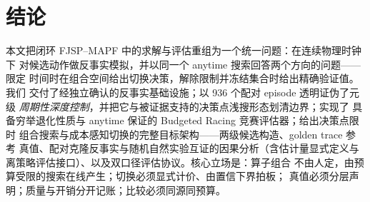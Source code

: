 \documentclass[11pt,a4paper]{article}
\newcommand{\racing}{Budgeted Racing}
\begin{document}
\section{结论}
\label{sec:conclusion}

本文把闭环 FJSP--MAPF 中的求解与评估重组为一个统一问题：在连续物理时钟下
对候选动作做反事实模拟，并以同一个 anytime 搜索回答两个方向的问题——限定
时间时在组合空间给出切换决策，解除限制并冻结集合时给出精确验证值。我们
交付了经独立确认的反事实基础设施；以 936 个配对 episode 透明证伪了元级
\emph{周期性深度控制}，并把它与被证据支持的决策点浅搜形态划清边界；实现了
具备穷举退化性质与 anytime 保证的 \racing{} 竞赛评估器；给出决策点限时
组合搜索与成本感知切换的完整目标架构——两级候选构造、golden trace 参考
真值、配对克隆反事实与随机自然实验互证的因果分析（含估计量显式定义与
离策略评估接口）、以及双口径评估协议。核心立场是：算子组合
不由人定，由预算受限的搜索在线产生；切换必须显式计价、由置信下界拍板；
真值必须分层声明；质量与开销分开记账；比较必须同源同预算。



\end{document}
